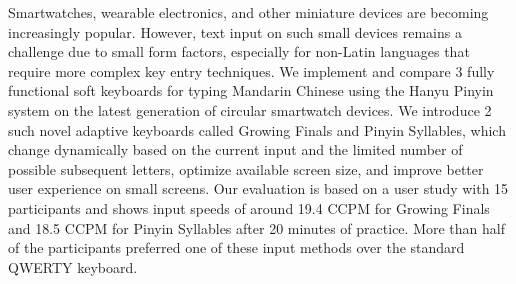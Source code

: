 

\begin{abstracten}

Smartwatches, wearable electronics, and other miniature devices are becoming increasingly popular. However, text input on such small devices remains a challenge due to small form factors, especially for non-Latin languages that require more complex key entry techniques. We implement and compare 3 fully functional soft keyboards for typing Mandarin Chinese using the Hanyu Pinyin system on the latest generation of circular smartwatch devices. We introduce 2 such novel adaptive keyboards called Growing Finals and Pinyin Syllables,  which change dynamically based on the current input and the limited number of possible subsequent letters, optimize available screen size, and improve better user experience on small screens.
Our evaluation is based on a user study with 15 participants and shows input speeds of around 19.4 CCPM for Growing Finals and 18.5 CCPM for Pinyin Syllables after 20 minutes of practice. More than half of the participants preferred one of these input methods over the standard QWERTY keyboard.
\end{abstracten}


\begin{comment}
\category{H.5.2.}{Information Interfaces and Presentation (e.g. HCI)}{User Interfaces; Input devices and strategies (e.g., mouse, touchscreen)}

\terms{Text Entry, Pinyin, Smartwatch, Human Factors, Performance}

\keywords{Chinese text entry; smartwatch; adaptive keyboard}
\end{comment}
